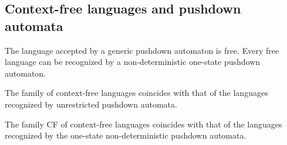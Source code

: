 \subsection*{Context-free languages and pushdown automata}
The language accepted by a generic pushdown automaton is free. 
Every free language can be recognized by a non-deterministic one-state pushdown automaton. 
\begin{property}
    The family of context-free languages coincides with that of the languages recognized by unrestricted pushdown automata. 
\end{property}
\begin{property}
    The family CF of context-free languages coincides with that of the languages recognized by the one-state non-deterministic pushdown automata.
\end{property}

